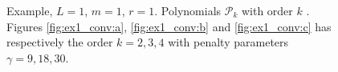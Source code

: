 \begin{figure}
    \caption{ Example, $L=1$, $m=1$, $r=1$. Polynomials $\mathcal{P}_{k} $ with order $k$ . Figures \ref{fig:ex1_conv:a}, \ref{fig:ex1_conv:b} and \ref{fig:ex1_conv:c} has respectively the order $k=2,3, 4$ with penalty parameters $\gamma = 9,18,30 $.  }
    \label{fig:ex1_conv}
\end{figure}


